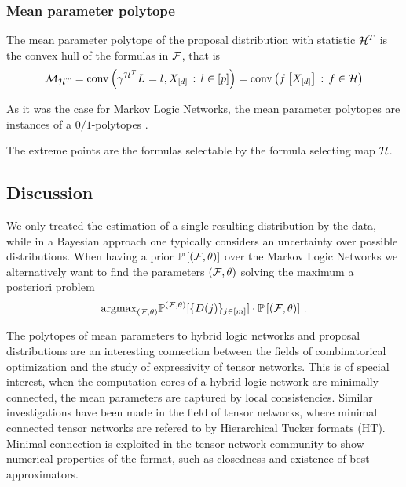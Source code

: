 \subsubsection{Mean parameter polytope}

The mean parameter polytope of the proposal distribution with statistic $\mathcal{H}^T$ is the convex hull of the formulas in $\mathcal{F}$, that is
\begin{align*}
	\mathcal{M}_{\mathcal{H}^T}
	= \mathrm{conv}\left(\gamma^{\mathcal{H}^T}{L_{}=l_{},X_{[d]}} \, : \, l\in[p]{}\right)
	= \mathrm{conv}\left(f\left[X_{[d]}\right] \, : \, f\in\mathcal{H}\right)
\end{align*}


As it was the case for Markov Logic Networks, the mean parameter polytopes are instances of a $0/1$-polytopes \cite{ziegler_lectures_1999,gillmann_01-polytopes_2007}.

The extreme points are the formulas selectable by the formula selecting map $\mathcal{H}$.


\subsection{Discussion}

\begin{remark}
	We only treated the estimation of a single resulting distribution by the data, while in a Bayesian approach one typically considers an uncertainty over possible distributions.
	When having a prior $\mathbb{P}\left[(\mathcal{F},\theta)\right]$ over the Markov Logic Networks we alternatively want to find the parameters $(\mathcal{F},\theta)$ solving the maximum a posteriori problem
	\begin{align}
		\mathrm{argmax}_{(\mathcal{F},\theta)} \mathbb{P}^{(\mathcal{F},\theta)}[\{D(j)\}_{j\in[m]}]\cdot \mathbb{P}\left[(\mathcal{F},\theta)\right]\, . 
	\end{align}
\end{remark}


The polytopes of mean parameters to hybrid logic networks and proposal distributions are an interesting connection between the fields of combinatorical optimization and the study of expressivity of tensor networks.
This is of special interest, when the computation cores of a hybrid logic network are minimally connected, the mean parameters are captured by local consistencies.
Similar investigations have been made in the field of tensor networks, where minimal connected tensor networks are refered to by Hierarchical Tucker formats (HT).
Minimal connection is exploited in the tensor network community to show numerical properties of the format, such as closedness and existence of best approximators.















